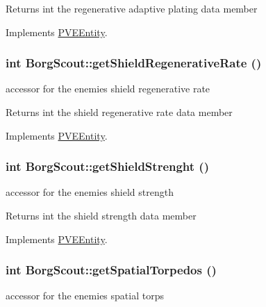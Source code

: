 \begin{DoxyReturn}{Returns}
int the regenerative adaptive plating data member 
\end{DoxyReturn}


Implements \hyperlink{classPVEEntity}{PVEEntity}.

\hypertarget{classBorgScout_a7fdb9eda7cced87acb05f9984742da47}{
\subsubsection[{getShieldRegenerativeRate}]{\setlength{\rightskip}{0pt plus 5cm}int BorgScout::getShieldRegenerativeRate ()}}
\label{d5/d8c/classBorgScout_a7fdb9eda7cced87acb05f9984742da47}
accessor for the enemies shield regenerative rate

\begin{DoxyReturn}{Returns}
int the shield regenerative rate data member 
\end{DoxyReturn}


Implements \hyperlink{classPVEEntity}{PVEEntity}.

\hypertarget{classBorgScout_a083b7b41ca27d5b3f4fa1772f95413e3}{
\subsubsection[{getShieldStrenght}]{\setlength{\rightskip}{0pt plus 5cm}int BorgScout::getShieldStrenght ()}}
\label{d5/d8c/classBorgScout_a083b7b41ca27d5b3f4fa1772f95413e3}
accessor for the enemies shield strength

\begin{DoxyReturn}{Returns}
int the shield strength data member 
\end{DoxyReturn}


Implements \hyperlink{classPVEEntity}{PVEEntity}.

\hypertarget{classBorgScout_a7fb32f9bc92f36e05bfb3db42b4b3d91}{
\subsubsection[{getSpatialTorpedos}]{\setlength{\rightskip}{0pt plus 5cm}int BorgScout::getSpatialTorpedos ()}}
\label{d5/d8c/classBorgScout_a7fb32f9bc92f36e05bfb3db42b4b3d91}
accessor for the enemies spatial torps

